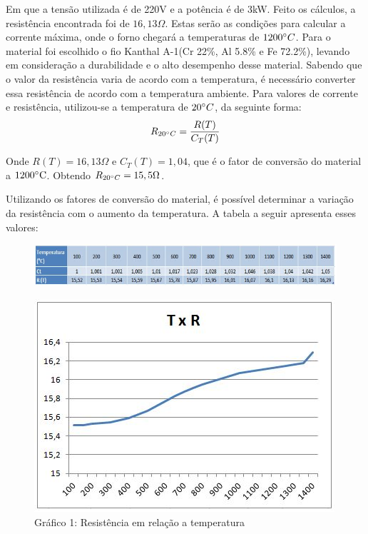 Em que a tensão utilizada é de 220V e a potência é de 3kW. Feito os cálculos, a resistência encontrada foi de $16,13 \Omega$. Estas serão as condições para calcular a corrente máxima, onde o forno chegará a temperaturas de $1200 \degree C$. Para o material foi escolhido o fio Kanthal A-1(Cr 22\%, Al 5.8\% e Fe 72.2\%), levando em consideração a durabilidade e o alto desempenho desse material. Sabendo que o valor da resistência varia de acordo com a temperatura, é necessário converter essa resistência de acordo com a temperatura ambiente. Para valores de corrente e resistência, utilizou-se a temperatura de $20 \degree C$, da seguinte forma:
\begin{gather}
    R_{20 \degree C} = \frac{R(T)}{C_T(T)}
\end{gather}

Onde $R(T)=16,13\Omega$ e $C_{T}(T)=1,04$, que é o fator de conversão do material a $1200\degree \text{C}$. Obtendo $R_{20\degree C}=15,5\Omega$.

Utilizando os fatores de conversão do material, é possível determinar a variação da resistência com o aumento da temperatura. A tabela a seguir apresenta esses valores:
\begin{figure}[H]
	\centering
	\label{tabela1}
	\includegraphics[keepaspectratio=true,scale=0.8]{figuras/alimentacao0.JPG}
\end{figure}
\begin{figure}[H]
	\centering
	\label{grafico1}
	\includegraphics[keepaspectratio=true,scale=0.8]{figuras/alimentacao0_1.JPG}
	\caption{Gráfico 1:  Resistência em relação a temperatura}
\end{figure}

